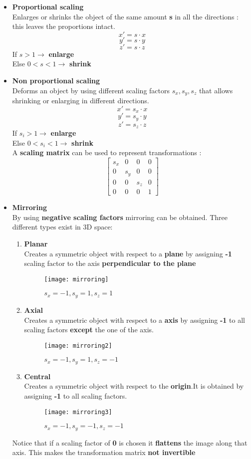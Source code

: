 \begin{itemize}
\item \textbf{Proportional scaling}\\
Enlarges or shrinks the object of the same amount \textbf{s} in all the directions : this leaves the proportions intact.
$$ x' = s \cdot x$$
$$ y' = s \cdot y$$
$$ z' = s \cdot z$$
If $ s > 1 \to $ \textbf{enlarge}\\
Else $ 0< s<1 \to $ \textbf{shrink} 
\item  \textbf{Non proportional scaling}\\
Deforms an object by using different scaling factors $ s_x, s_y,s_z$ that allows shrinking or enlarging in different directions.\\
$$ x' = s_x \cdot x$$
$$ y' = s_y \cdot y$$
$$ z' = s_z \cdot z$$
If $ s_i > 1 \to $ \textbf{enlarge}\\
Else $ 0< s_i<1 \to $ \textbf{shrink}\\
A \textbf{scaling matrix} can be used to represent transformations :
$$	
\begin{bmatrix}
       s_x & 0 & 0 & 0           \\[0.3em]
       0 & s_y & 0 & 0		    \\[0.3em]
       0 & 0 & s_z & 0			\\[0.3em]
       0 & 0 & 0 & 1
     \end{bmatrix} 
$$
\item \textbf{Mirroring}\\
By using \textbf{negative scaling factors} mirroring can be obtained. Three different types exist in 3D space:
\begin{enumerate}
\item \textbf{Planar}\\
Creates a symmetric object with respect to a \textbf{plane} by assigning \textbf{-1} scaling factor to the axis \textbf{perpendicular to the plane}
\begin{figure}[H]
\centering
  \texttt{[image: mirroring]}
  \caption{$ s_x =-1, s_y=1 ,s_z=1$}
\end{figure}
\newpage
\item \textbf{Axial}\\
Creates a symmetric object with respect to a \textbf{axis} by assigning \textbf{-1} to all scaling factors \textbf{except} the one of the axis.
\begin{figure}[H]
\centering
  \texttt{[image: mirroring2]}
  \caption{$ s_x =-1, s_y=1 ,s_z=-1$}
\end{figure}
\item \textbf{Central}\\
Creates a symmetric object with respect to the \textbf{origin}.It is obtained by assigning \textbf{-1} to all scaling factors.
\begin{figure}[H]
\centering
  \texttt{[image: mirroring3]}
  \caption{$ s_x =-1, s_y=-1 ,s_z=-1$}
\end{figure}
\end{enumerate}
Notice that if a scaling factor of \textbf{0} is chosen it \textbf{flattens} the image along that axis. This makes the transformation matrix \textbf{not invertible}
\end{itemize}

